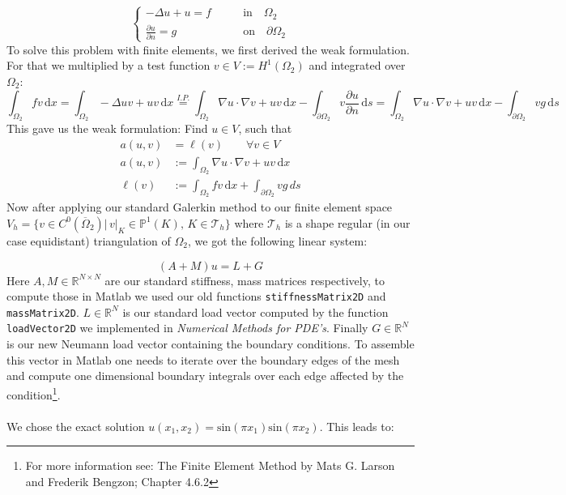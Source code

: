 \documentclass{article}
\begin{document}
\begin{equation}\label{time indep strong formulation}
\left\{
\begin{aligned}
	-\Delta u + u = f \qquad &\text{in} \quad \Omega_2 \\
	\frac{\partial u}{\partial n} = g \qquad &\text{on} \quad \partial\Omega_2 
\end{aligned}
\right.
\end{equation}
To solve this problem with finite elements, we first derived the weak formulation. For that we multiplied by a test function $v \in V := H^1(\Omega_2)$ and integrated over $\Omega_2$:
\[
	\int_{\Omega_2}fv \, \text{d}x = \int_{\Omega_2}-\Delta u v + u v \,\text{d}x
	\overset{I.P.}{=} \int_{\Omega_2}\nabla u \cdot \nabla v + uv \, \text{d}x
	-\int_{\partial\Omega_2} v \frac{\partial u}{\partial n}\, \text{d}s
	= \int_{\Omega_2}\nabla u \cdot \nabla v + uv \, \text{d}x
	-\int_{\partial\Omega_2} v g\, \text{d}s
\]
This gave us the weak formulation: Find $u \in V$, such that
\begin{equation}\label{time indep weak formulation}
\begin{aligned}
a(u,v) &= \ell(v)\qquad  \forall v\in V \\
a(u,v) &:=  \int_{\Omega_2}\nabla u \cdot \nabla v + uv \, \text{d}x \\
\ell(v) & := \int_{\Omega_2} fv \, \text{d}x + \int_{\partial \Omega_2} vg\, ds
\end{aligned}
\end{equation}
Now after applying our standard Galerkin method to our finite element space $V_h = \{v \in C^0(\overline{\Omega}_2)| \, v|_K \in \mathbb{P}^1(K), \, K\in \mathcal{T}_h\}$ where $\mathcal{T}_h$ is a shape regular (in our case equidistant) triangulation of $\Omega_2$, we got the following linear system:

\[
	(A + M)u = L + G
\]
Here $A,M \in  \mathbb{R}^{N \times N}$ are our standard stiffness, mass matrices respectively, to compute those in Matlab we used our old functions \texttt{stiffnessMatrix2D} and \texttt{massMatrix2D}. $L \in \mathbb{R}^N$ is our standard load vector computed by the function \texttt{loadVector2D} we implemented in \textit{Numerical Methods for PDE's}. Finally $G \in \mathbb{R}^N$ is our new Neumann load vector containing the boundary conditions. To assemble this vector in Matlab one needs to iterate over the boundary edges of the mesh and compute one dimensional boundary integrals over each edge affected by the condition\footnote{For more information see: The Finite Element Method by Mats G. Larson and Frederik Bengzon; Chapter 4.6.2}. \\ \\
We chose the exact solution $u(x_1,x_2) = \text{sin}(\pi x_1)\text{sin}(\pi x_2)$. This leads to:
\end{document}
